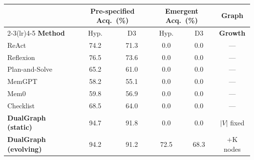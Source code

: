 \begin{tabular}{@{}lccccc@{}}
\toprule
& \multicolumn{2}{c}{\textbf{Pre-specified Acq.\ (\%)}}
& \multicolumn{2}{c}{\textbf{Emergent Acq.\ (\%)}}
& \textbf{Graph} \\
\cmidrule(lr){2-3}\cmidrule(lr){4-5}
\textbf{Method} & Hyp. & D3 & Hyp. & D3 & \textbf{Growth} \\
\midrule
ReAct & 74.2 & 71.3 & 0.0 & 0.0 & --- \\
Reflexion & 76.5 & 73.6 & 0.0 & 0.0 & --- \\
Plan-and-Solve & 65.2 & 61.0 & 0.0 & 0.0 & --- \\
MemGPT & 58.2 & 55.1 & 0.0 & 0.0 & --- \\
Mem0 & 59.8 & 56.9 & 0.0 & 0.0 & --- \\
Checklist & 68.5 & 64.0 & 0.0 & 0.0 & --- \\
\textbf{DualGraph (static)} & 94.7 & 91.8 & 0.0 & 0.0 & $|V|$ fixed \\
\textbf{DualGraph (evolving)} & 94.2 & 91.2 & 72.5 & 68.3 & $+$K nodes \\
\bottomrule
\end{tabular}